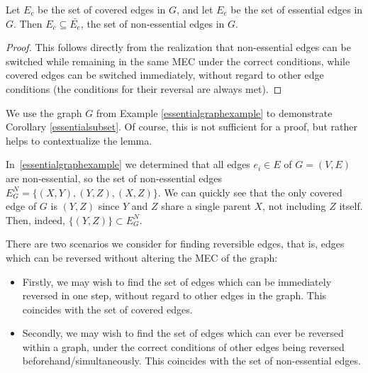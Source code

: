 \begin{corollary}\label{essentialsubset}
Let $E_{c}$ be the set of covered edges in $G$, and let $E_{e}$ be the set of essential edges in $G$. Then $E_{c} \subseteq \bar{E_{e}}$, the set of non-essential edges in $G$.
\begin{proof}
This follows directly from the realization that non-essential edges can be switched while remaining in the same MEC under the correct conditions, while covered edges can be switched immediately, without regard to other edge conditions (the conditions for their reversal are always met). 
\end{proof}
\end{corollary}

\begin{example}
We use the graph $G$ from Example \ref{essentialgraphexample} to demonstrate Corollary \ref{essentialsubset}. Of course, this is not sufficient for a proof, but rather helps to contextualize the lemma. 

\begin{figure}[h!]
\begin{center}
\end{center}
\caption{}
\end{figure}

 In~\cref{essentialgraphexample} we determined that all edges $e_{i} \in E$ of $G=(V,E)$ are non-essential, so the set of non-essential edges $E_{G}^{N} = \{(X,Y), (Y,Z), (X,Z) \}$. We can quickly see that the only covered edge of $G$ is $(Y,Z)$ since $Y$ and $Z$ share a single parent $X$, not including $Z$ itself. Then, indeed, $\{(Y,Z) \} \subset E_{G}^{N}$.

\end{example}


\begin{remark} There are two scenarios we consider for finding reversible edges, that is, edges which can be reversed without altering the MEC of the graph:
\begin{itemize} 
\item Firstly, we may wish to find the set of edges which can be immediately reversed in one step, without regard to other edges in the graph. This coincides with the set of covered edges. 
\item Secondly, we may wish to find the set of edges which can ever be reversed within a graph, under the correct conditions of other edges being reversed beforehand/simultaneously. This coincides with the set of non-essential edges.
 \end{itemize}
\end{remark}

